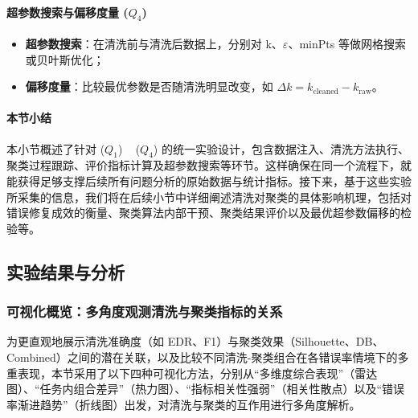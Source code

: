 \documentclass[10pt]{article} %
\numberwithin{equation}{section}
\begin{document}
\paragraph{超参数搜索与偏移度量 (\(Q_4\))}
\begin{itemize}
    \item \textbf{超参数搜索}：在清洗前与清洗后数据上，分别对 k、$\varepsilon$、minPts 等做网格搜索或贝叶斯优化；
    \item \textbf{偏移度量}：比较最优参数是否随清洗明显改变，如 $\Delta k = k_{\text{cleaned}} - k_{\text{raw}}$。
\end{itemize}

\paragraph{本节小结}
本小节概述了针对 (\(Q_1\)) ~ (\(Q_4\)) 的统一实验设计，包含数据注入、清洗方法执行、聚类过程跟踪、评价指标计算及超参数搜索等环节。这样确保在同一个流程下，就能获得足够支撑后续所有问题分析的原始数据与统计指标。接下来，基于这些实验所采集的信息，我们将在后续小节中详细阐述清洗对聚类的具体影响机理，包括对错误修复成效的衡量、聚类算法内部干预、聚类结果评价以及最优超参数偏移的检验等。

\subsection{实验结果与分析}
\label{sec:exp_results}

\subsubsection{可视化概览：多角度观测清洗与聚类指标的关系}
\label{subsec:viz_overview}

为更直观地展示清洗准确度（如 EDR、F1）与聚类效果（Silhouette、DB、Combined）之间的潜在关联，以及比较不同清洗-聚类组合在各错误率情境下的多重表现，本节采用了以下四种可视化方法，分别从“多维度综合表现”（雷达图）、“任务内组合差异”（热力图）、“指标相关性强弱”（相关性散点）以及“错误率渐进趋势”（折线图）出发，对清洗与聚类的互作用进行多角度解析。
\end{document}
